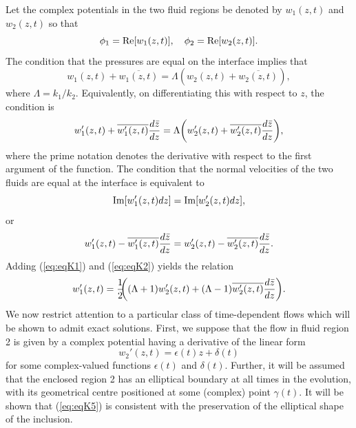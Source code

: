 \documentclass{article}
\begin{document}
Let the complex potentials in the two fluid regions be denoted
by $w_1(z,t)$ and $w_2(z,t)$ so that
\begin{equation}
\phi_1 = {\rm Re}[w_1(z,t)],\quad \phi_2 = {\rm Re}[w_2(z,t)].
\end{equation}
The condition that the pressures are equal on the interface implies
that
\begin{equation}
w_1(z,t) + \overline{w_1(z,t)} = \Lambda {\left(w_2(z,t) + \overline{w_2(z,t)}\right)},
\end{equation}
where $\Lambda =k_1/k_2$. Equivalently,
on differentiating this with respect to $z$, the condition is
\begin{equation}
w_1'(z,t) + \overline{w_1'(z,t)} {d \bar{z} \over dz} = \Lambda {\left(w_2'(z,t) + \overline{w_2'(z,t)}{d \bar{z} \over dz}
\right )},\label{eq:eqK1}
\end{equation}
where the prime notation denotes the derivative with respect to
the first argument of the function. The condition that the normal velocities of the two fluids are equal at the interface is equivalent to
\begin{equation}
{\rm Im}[w_1'(z,t) dz] = {\rm Im}[w_2'(z,t) dz],
\end{equation} 
or
\begin{equation}
w_1'(z,t) - \overline{w_1'(z,t)} {d \bar{z} \over dz} = 
w_2'(z,t) - \overline{w_2'(z,t)}{d \bar{z} \over dz}.
\label{eq:eqK2}
\end{equation}
Adding (\ref{eq:eqK1}) and (\ref{eq:eqK2}) yields the relation
\begin{equation}
w_1'(z,t) = {1 \over 2}\!\!{\left((\Lambda+1) w_2'(z,t) + (\Lambda-1) \overline{w_2'(z,t)} {d \bar{z} \over dz}\right)}.\label{eq:eqK6}
\end{equation}
We now restrict attention to 
a particular class of time-dependent flows which will
be shown to admit exact solutions. First, we
suppose that the flow in fluid region 2 is given by a complex
potential having a derivative of the linear form
\begin{equation}
w_2'(z,t) = \epsilon(t) z + \delta(t)\label{eq:eqK5}
\end{equation}
for some complex-valued functions $\epsilon(t)$ and $\delta(t)$. Further,
it will be assumed that the enclosed region 2 has an elliptical boundary
at all times in the evolution, with its geometrical centre positioned at
some (complex) point $\gamma(t)$. It will be shown that (\ref{eq:eqK5}) is
consistent with the preservation of the elliptical shape of the inclusion.
\end{document}
